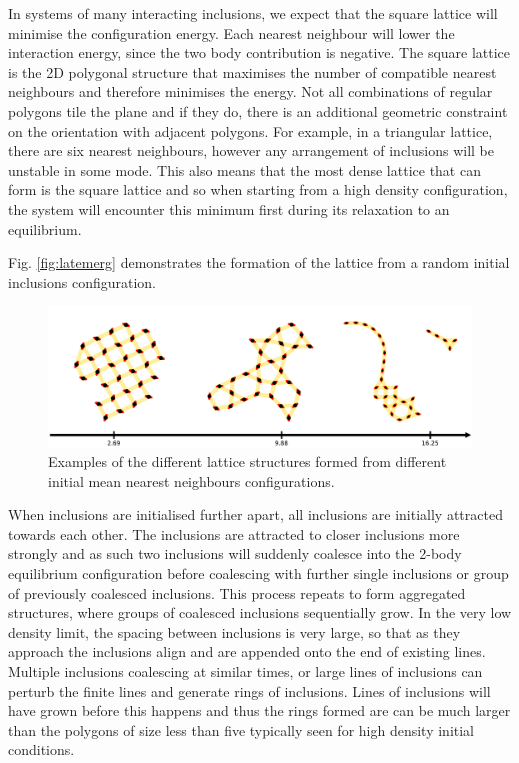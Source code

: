 In systems of many interacting inclusions, we expect that the square lattice will minimise the configuration energy. Each nearest neighbour will lower the interaction energy, since the two body contribution is negative. The square lattice is the 2D polygonal structure that maximises the number of compatible nearest neighbours and therefore minimises the energy. Not all combinations of regular polygons tile the plane and if they do, there is an additional geometric constraint on the orientation with adjacent polygons. For example, in a triangular lattice, there are six nearest neighbours, however any arrangement of inclusions will be unstable in some mode. This also means that the most dense lattice that can form is the square lattice and so when starting from a high density configuration, the system will encounter this minimum first during its relaxation to an equilibrium.

Fig. \ref{fig:latemerg} demonstrates the formation of the lattice from a random initial inclusions configuration.

\begin{figure}[h]
\centering
\includegraphics[width=15cm]{figures/3-elastic-figs/different_starts_sample.pdf}
\caption{Examples of the different lattice structures formed from different initial mean nearest neighbours configurations. }
\end{figure}

When inclusions are initialised further apart, all inclusions are initially attracted towards each other. The inclusions are attracted to closer inclusions more strongly and as such two inclusions will suddenly coalesce into the 2-body equilibrium configuration before coalescing with further single inclusions or group of previously coalesced inclusions. This process repeats to form aggregated structures, where groups of coalesced inclusions sequentially grow. In the very low density limit, the spacing between inclusions is very large, so that as they approach the inclusions align and are appended onto the end of existing lines. Multiple inclusions coalescing at similar times, or large lines of inclusions  can perturb the finite lines and generate rings of inclusions. Lines of inclusions will have grown before this happens and thus the rings formed are can be much larger than the polygons of size less than five typically seen for high density initial conditions.

